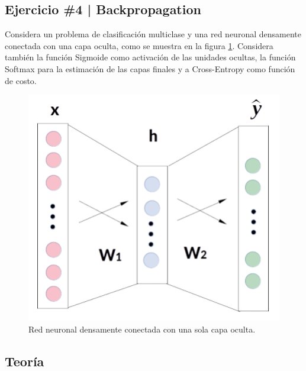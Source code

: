 \newpage

\begin{myblock}
\section*{Ejercicio \#4 | Backpropagation}

Considera un problema de clasificación multiclase y una red neuronal densamente conectada con una
capa oculta, como se muestra en la figura \ref{fig:red_p02}. Considera también la función Sigmoide como 
activación de las unidades ocultas, la función Softmax para la estimación de las capas finales y
a Cross-Entropy como función de costo. 

\end{myblock}

\begin{figure}[h!]
    \centering
    \includegraphics[width=0.4\linewidth]{Images/Red_Problema_02.png}
    \caption{Red neuronal densamente conectada con una sola capa oculta.}
    \label{fig:red_p02}
\end{figure}




\subsection{Teoría}



